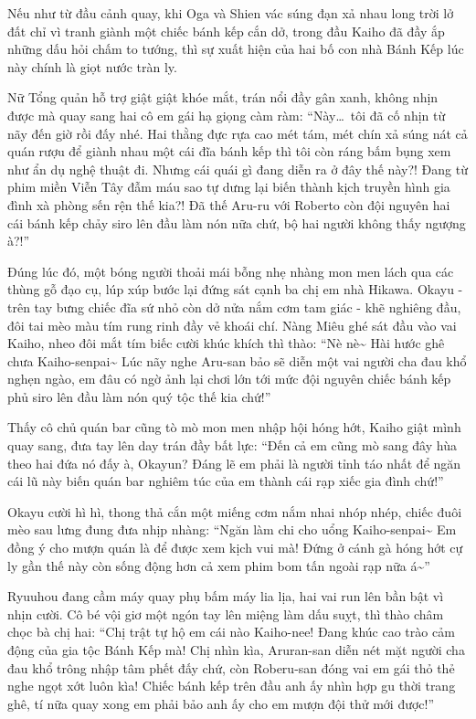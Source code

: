 \documentclass[../main.tex]{subfiles}
\begin{document}
Nếu như từ đầu cảnh quay, khi Oga và Shien vác súng đạn xả nhau long trời lở đất chỉ vì tranh giành một chiếc bánh kếp cắn dở, trong đầu Kaiho đã đầy ắp những dấu hỏi chấm to tướng, thì sự xuất hiện của hai bố con nhà Bánh Kếp lúc này chính là giọt nước tràn ly.

Nữ Tổng quản hỗ trợ giật giật khóe mắt, trán nổi đầy gân xanh, không nhịn được mà quay sang hai cô em gái hạ giọng càm ràm: ``Này\dots\ tôi đã cố nhịn từ nãy đến giờ rồi đấy nhé. Hai thằng đực rựa cao mét tám, mét chín xả súng nát cả quán rượu để giành nhau một cái đĩa bánh kếp thì tôi còn ráng bấm bụng xem như ẩn dụ nghệ thuật đi. Nhưng cái quái gì đang diễn ra ở đây thế này?! Đang từ phim miền Viễn Tây đẫm máu sao tự dưng lại biến thành kịch truyền hình gia đình xà phòng sến rện thế kia?! Đã thế Aru-ru với Roberto còn đội nguyên hai cái bánh kếp chảy siro lên đầu làm nón nữa chứ, bộ hai người không thấy ngượng à?!''

Đúng lúc đó, một bóng người  thoải mái bỗng nhẹ nhàng mon men lách qua các thùng gỗ đạo cụ, lúp xúp bước lại đứng sát cạnh ba chị em nhà Hikawa. Okayu - trên tay bưng chiếc đĩa sứ nhỏ còn dở nửa nắm cơm tam giác - khẽ nghiêng đầu, đôi tai mèo màu tím rung rinh đầy vẻ khoái chí. Nàng Miêu ghé sát đầu vào vai Kaiho, nheo đôi mắt tím biếc cười khúc khích thì thào: ``Nè nè\~{} Hài hước ghê chưa Kaiho-senpai\~{} Lúc nãy nghe Aru-san bảo sẽ diễn một vai người cha đau khổ nghẹn ngào, em đâu có ngờ ảnh lại chơi lớn tới mức đội nguyên chiếc bánh kếp phủ siro lên đầu làm nón quý tộc thế kia chứ!''

Thấy cô chủ quán bar cũng tò mò mon men nhập hội hóng hớt, Kaiho giật mình quay sang, đưa tay lên day trán đầy bất lực: ``Đến cả em cũng mò sang đây hùa theo hai đứa nó đấy à, Okayun? Đáng lẽ em phải là người tỉnh táo nhất để ngăn cái lũ này biến quán bar nghiêm túc của em thành cái rạp xiếc gia đình chứ!''

Okayu cười hì hì, thong thả cắn một miếng cơm nắm nhai nhóp nhép, chiếc đuôi mèo sau lưng đung đưa nhịp nhàng: ``Ngăn làm chi cho uổng Kaiho-senpai\~{} Em đồng ý cho mượn quán là để được xem kịch vui mà! Đứng ở cánh gà hóng hớt cự ly gần thế này còn sống động hơn cả xem phim bom tấn ngoài rạp nữa á\~{}''

Ryuuhou đang cầm máy quay phụ bấm máy lia lịa, hai vai run lên bần bật vì nhịn cười. Cô bé vội giơ một ngón tay lên miệng làm dấu suỵt, thì thào châm chọc bà chị hai: ``Chị trật tự hộ em cái nào Kaiho-nee! Đang khúc cao trào cảm động của gia tộc Bánh Kếp mà! Chị nhìn kìa, Aruran-san diễn nét mặt người cha đau khổ trông nhập tâm phết đấy chứ, còn Roberu-san đóng vai em gái thỏ thẻ nghe ngọt xớt luôn kìa! Chiếc bánh kếp trên đầu anh ấy nhìn hợp gu thời trang ghê, tí nữa quay xong em phải bảo anh ấy cho em mượn đội thử mới được!''
\end{document}
